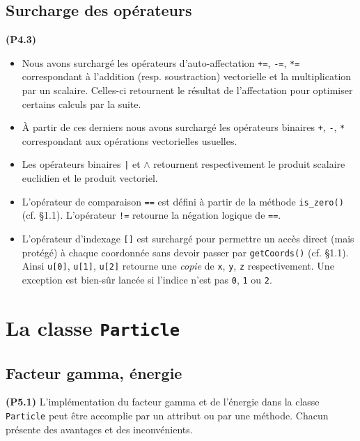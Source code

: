 \documentclass[12pt, letterpaper, twoside]{article}
\newcommand{\T}[1]{\texttt{#1}}
\begin{document}
\subsection{Surcharge des opérateurs}
\noindent \textbf{(P4.3)}
\begin{itemize}
\item Nous avons surchargé les opérateurs d'auto-affectation \T{+=}, \T{-=}, \T{*=} correspondant à l'addition (resp. soustraction) vectorielle et la multiplication par un scalaire. Celles-ci retournent le résultat de l'affectation pour optimiser certains calculs par la suite.

\item À partir de ces derniers nous avons surchargé les opérateurs binaires \T{+}, \T{-}, \T{*} correspondant aux opérations vectorielles usuelles.

\item Les opérateurs binaires \T{|} et \T{$\wedge$} retournent respectivement le produit scalaire euclidien et le produit vectoriel.

\item L'opérateur de comparaison \T{==} est défini à partir de la méthode \T{is\_zero()} (cf. \S1.1). L'opérateur \T{!=} retourne la négation logique de \T{==}.

\item L'opérateur d'indexage \T{[]} est surchargé pour permettre un accès direct (mais protégé) à chaque coordonnée sans devoir passer par \T{getCoords()} (cf. \S 1.1). Ainsi \T{u[0]}, \T{u[1]}, \T{u[2]} retourne une \textit{copie} de \T{x}, \T{y}, \T{z} respectivement. Une exception est bien-sûr lancée si l'indice n'est pas \T{0}, \T{1} ou \T{2}.
\end{itemize}

\section{La classe \T{Particle}}

\subsection{Facteur gamma, énergie}
\noindent \textbf{(P5.1)}
L'implémentation du facteur gamma et de l'énergie dans la classe \T{Particle} peut être accomplie par un attribut ou par une méthode. Chacun présente des avantages et des inconvénients.
\end{document}
